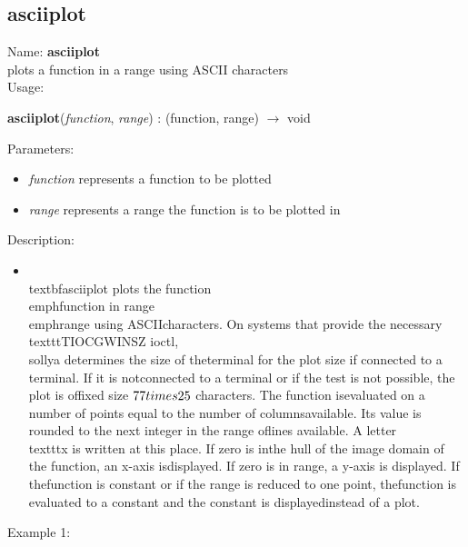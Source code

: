 \subsection{asciiplot}
\label{labasciiplot}
\noindent Name: \textbf{asciiplot}\\
plots a function in a range using ASCII characters\\
\noindent Usage: 
\begin{center}
\textbf{asciiplot}(\emph{function}, \emph{range}) : (\textsf{function}, \textsf{range}) $\rightarrow$ \textsf{void}\\
\end{center}
Parameters: 
\begin{itemize}
\item \emph{function} represents a function to be plotted
\item \emph{range} represents a range the function is to be plotted in 
\end{itemize}
\noindent Description: \begin{itemize}

\item \\textbf{asciiplot} plots the function \\emph{function} in range \\emph{range} using ASCII\n   characters.  On systems that provide the necessary \n   \\texttt{TIOCGWINSZ ioctl}, \\sollya determines the size of the\n   terminal for the plot size if connected to a terminal. If it is not\n   connected to a terminal or if the test is not possible, the plot is of\n   fixed size $77\\times25$ characters.  The function is\n   evaluated on a number of points equal to the number of columns\n   available. Its value is rounded to the next integer in the range of\n   lines available. A letter \\texttt{x} is written at this place. If zero is in\n   the hull of the image domain of the function, an x-axis is\n   displayed. If zero is in range, a y-axis is displayed.  If the\n   function is constant or if the range is reduced to one point, the\n   function is evaluated to a constant and the constant is displayed\n   instead of a plot.\n\end{itemize}
\noindent Example 1: 
\begin{center}\begin{minipage}{15cm}\begin{Verbatim}[frame=single]
\end{Verbatim}
\end{minipage}\end{center}
